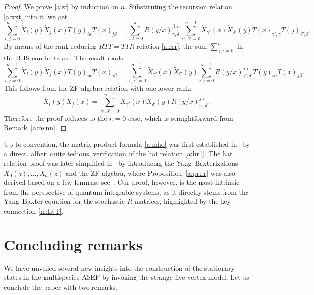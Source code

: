 \begin{proof}
We prove \eqref{a:zf}  by induction on $n$.
Substituting the recursion relation \eqref{a:xxt} into it, we get 
\begin{equation}
\sum_{i,j=0}^{n-1} \widetilde{X}_i(y)\widetilde{X}_j(x) T(y)_{i \alpha}T(x)_{j \beta}
 =\sum_{\gamma, \delta=0}^n  R(y/x)^{\beta, \alpha}_{\gamma, \delta}
 \sum_{\gamma', \delta'=0}^{n-1}
 \widetilde{X}_{\gamma'}(x)\widetilde{X}_{\delta'}(y) 
T(x)_{\gamma', \gamma}T(y)_{\delta', \delta}.
 \end{equation}
By means of the rank reducing $RTT=TTR$ relation \eqref{a:rrr}, 
the sum $\sum_{\gamma, \delta=0}^n$ in the RHS can be taken. 
The result reads
\begin{equation}
\sum_{i,j=0}^{n-1} \widetilde{X}_i(y)\widetilde{X}_j(x) T(y)_{i \alpha}T(x)_{j \beta}
 =
\sum_{\gamma', \delta'=0}^{n-1}
\widetilde{X}_{\gamma'}(x)\widetilde{X}_{\delta'}(y) 
\sum_{i,j=0}^{n-1} 
R(y/x)^{j,i}_{\gamma', \delta'}
 T(y)_{i \alpha}T(x)_{j \beta}.
\end{equation}
This follows from the ZF algebra relation with one lower rank:
\[
\widetilde{X}_i(y) \widetilde{X}_j(x) = \sum_{\gamma', \delta'=0}^{n-1} \widetilde{X}_{\gamma'}(x)\widetilde{X}_{\delta'}(y) R(y/x)^{j,i}_{\gamma', \delta'}.
\]
Therefore the proof reduces to the $n=0$ case, which is straightforward from Remark~\ref{a:re:nn}.
\end{proof}

Up to convention, the matrix product formula \eqref{a:mho} was first established 
in~\cite{PEM} by a direct, albeit quite tedious, verification of the hat relation 
\eqref{a:hr1}. The hat relation proof was later simplified in~\cite{CDW} by introducing 
the Yang--Baxterizations \(X_0(z), \ldots, X_n(z)\) and the ZF algebra, 
where Proposition~\ref{a:pr:rr} was also derived based on a few lemmas; 
see~\cite[Eq.(36)]{CDW}. Our proof, however, is the most intrinsic from the 
perspective of quantum integrable systems, as it directly stems from the 
Yang--Baxter equation for the stochastic \(R\) matrices, highlighted 
by the key connection \eqref{m:LtT}.


\section{Concluding remarks}\label{sec:cr}

We have unveiled several new insights into the construction of the 
stationary states in the multispecies ASEP by invoking the strange five vertex model.
Let us conclude the paper with two remarks.

